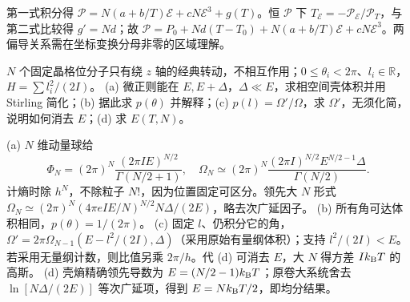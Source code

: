 \begin{solution}
第一式积分得 $\mathcal P=N(a+b/T)\mathcal E+cN\mathcal E^3+g(T)$。恒 $\mathcal P$ 下 $T_{\mathcal E}=-\mathcal P_{\mathcal E}/\mathcal P_T$，与第二式比较得 $g'=Nd$；故 $\mathcal P=P_0+Nd(T-T_0)+N(a+b/T)\mathcal E+cN\mathcal E^3$。两偏导关系需在坐标变换分母非零的区域理解。
\end{solution}
\begin{exercise}
$N$ 个固定晶格位分子只有绕 $z$ 轴的经典转动，不相互作用；$0\le\theta_i<2\pi$、$l_i\in\mathbb R$，$H=\sum l_i^2/(2I)$。
(a) 微正则能在 $E,E+\Delta$，$\Delta\ll E$，求相空间壳体积并用 Stirling 简化；(b) 据此求 $p(\theta)$ 并解释；(c) $p(l)=\Omega'/\Omega$，求 $\Omega'$，无须化简，说明如何消去 $E$；(d) 求 $E(T,N)$。
\end{exercise}
\begin{solution}
(a) $N$ 维动量球给
\[\Phi_N=(2\pi)^N\frac{(2\pi I E)^{N/2}}{\Gamma(N/2+1)},\quad
\Omega_N\simeq(2\pi)^N\frac{(2\pi I)^{N/2}E^{N/2-1}\Delta}{\Gamma(N/2)}.\]
计熵时除 $h^N$，不除粒子 $N!$，因为位置固定可区分。领先大 $N$ 形式 $\Omega_N\simeq(2\pi)^N(4\pi eIE/N)^{N/2}N\Delta/(2E)$，略去次广延因子。
(b) 所有角可达体积相同，$p(\theta)=1/(2\pi)$。
(c) 固定 $l$、仍积分它的角，$\Omega'=2\pi\Omega_{N-1}(E-l^2/(2I),\Delta)$（采用原始有量纲体积）；支持 $l^2/(2I)<E$。若采用无量纲计数，则比值另乘 $2\pi/h$。代 (d) 可消去 $E$，大 $N$ 得方差 $Ik_{\mathrm B} T$ 的高斯。
(d) 壳熵精确领先导数为 $E=(N/2-1)k_{\mathrm B} T$；原卷大系统舍去 $\ln[N\Delta/(2E)]$ 等次广延项，得到 $E=Nk_{\mathrm B} T/2$，即均分结果。
\end{solution}
